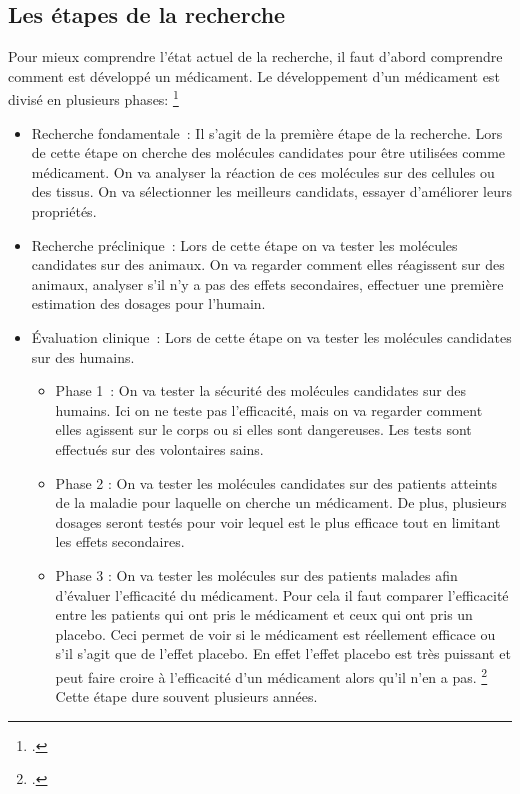 \documentclass[12pt,a4paper]{report}
\begin{document}
\begin{appendix}

    \chapter{Les étapes de la recherche} \label{annexe:etapes_recherche}

    Pour mieux comprendre l'état actuel de la recherche, il faut d'abord comprendre comment est développé un médicament.
Le développement d'un médicament est divisé en plusieurs phases: \footcite{DeveloppementMedicamentInserm}

\begin{itemize}
    \item Recherche fondamentale : Il s'agit de la première étape de la recherche.
    Lors de cette étape on cherche des molécules candidates pour être utilisées comme médicament.
    On va analyser la réaction de ces molécules sur des cellules ou des tissus.
    On va sélectionner les meilleurs candidats, essayer d'améliorer leurs propriétés.

    \item Recherche préclinique : Lors de cette étape on va tester les molécules candidates sur des animaux.
    On va regarder comment elles réagissent sur des animaux, analyser s'il n'y a pas des effets secondaires, effectuer une première estimation des dosages pour l'humain.

    \item Évaluation clinique : Lors de cette étape on va tester les molécules candidates sur des humains.

    \begin{itemize}
        \item Phase 1 : On va tester la sécurité des molécules candidates sur des humains. Ici on ne teste pas l'efficacité, mais on va regarder comment elles agissent sur le corps ou si elles sont dangereuses. Les tests sont effectués sur des volontaires sains.
        \item Phase 2 : On va tester les molécules candidates sur des patients atteints de la maladie pour laquelle on cherche un médicament. De plus, plusieurs dosages seront testés pour voir lequel est le plus efficace tout en limitant les effets secondaires.
        \item Phase 3 : On va tester les molécules sur des patients malades afin d'évaluer l'efficacité du médicament. Pour cela il faut comparer l'efficacité entre les patients qui ont pris le médicament et ceux qui ont pris un placebo. Ceci permet de voir si le médicament est réellement efficace ou s'il s'agit que de l'effet placebo. En effet l'effet placebo est très puissant et peut faire croire à l'efficacité d'un médicament alors qu'il n'en a pas. \footcite{decraenPlacebosPlaceboEffects1999} Cette étape dure souvent plusieurs années.
    \end{itemize}


\end{itemize}
\end{appendix}
\end{document}
